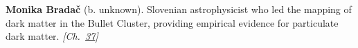 \textbf{Monika Bradač} (b. unknown). Slovenian astrophysicist who led the mapping of dark matter in the Bullet Cluster, providing empirical evidence for particulate dark matter. \emph{[Ch.~\hyperref[ch:darkmatterevidence]{37}]}

